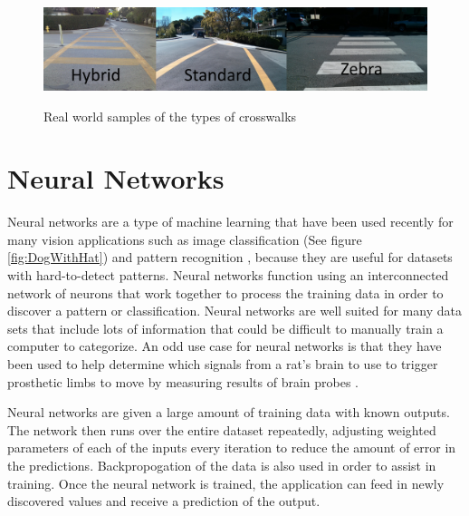 \documentclass[12pt]{ucthesis}
\newcommand{\captionfonts}{\small\bf\ssp}
\begin{document}
\begin{figure}[h!]
\begin{center}
\includegraphics[width=13cm]{All3Types.jpg}
\captionfonts
\caption[Real Photos of Crosswalk Types]{Real world samples of the types of crosswalks}
\label{fig:TypesOfXwalksRealFig}
\end{center}
\end{figure}

\section{Neural Networks}
Neural networks are a type of machine learning that have been used recently for many vision applications such as image classification (See figure \ref{fig:DogWithHat}) and pattern recognition \cite{christianszegedy2014}, because they are useful for datasets with hard-to-detect patterns. Neural networks function using an interconnected network of neurons that work together to process the training data in order to discover a pattern or classification. Neural networks are well suited for many data sets that include lots of information that could be difficult to manually train a computer to categorize. An odd use case for neural networks is that they have been used to help determine which signals from a rat's brain to use to trigger prosthetic limbs to move by measuring results of brain probes \cite{ratNeural}.

Neural networks are given a large amount of training data with known outputs. The network then runs over the entire dataset repeatedly, adjusting weighted parameters of each of the inputs every iteration to reduce the amount of error in the predictions. Backpropogation of the data is also used in order to assist in training. Once the neural network is trained, the application can feed in newly discovered values and receive a prediction of the output.
\end{document}
